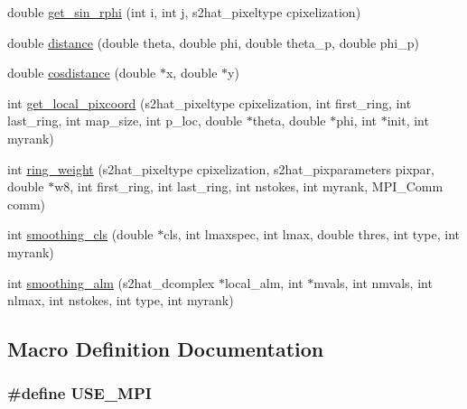 \begin{DoxyCompactItemize}
\item 
double \hyperlink{rng_2common_2lensing__sub_8c_aacc42f0ba3fce9b9951cd6dba4d60ebf}{get\-\_\-sin\-\_\-rphi} (int i, int j, s2hat\-\_\-pixeltype cpixelization)
\item 
double \hyperlink{rng_2common_2lensing__sub_8c_a8dbb3ac3e6c8aa872d542c9789239708}{distance} (double theta, double phi, double theta\-\_\-p, double phi\-\_\-p)
\item 
double \hyperlink{rng_2common_2lensing__sub_8c_a356fc5cd79e083685c111f791709e85b}{cosdistance} (double $\ast$x, double $\ast$y)
\item 
int \hyperlink{rng_2common_2lensing__sub_8c_a1885e18dc221add8ca7394f9036fe883}{get\-\_\-local\-\_\-pixcoord} (s2hat\-\_\-pixeltype cpixelization, int first\-\_\-ring, int last\-\_\-ring, int map\-\_\-size, int p\-\_\-loc, double $\ast$theta, double $\ast$phi, int $\ast$init, int myrank)
\item 
int \hyperlink{rng_2common_2lensing__sub_8c_a87dbb12172642ed57bdcb2e08f81d9e1}{ring\-\_\-weight} (s2hat\-\_\-pixeltype cpixelization, s2hat\-\_\-pixparameters pixpar, double $\ast$w8, int first\-\_\-ring, int last\-\_\-ring, int nstokes, int myrank, M\-P\-I\-\_\-\-Comm comm)
\item 
int \hyperlink{rng_2common_2lensing__sub_8c_aac6a81491aae649df50864a5ba13afac}{smoothing\-\_\-cls} (double $\ast$cls, int lmaxspec, int lmax, double thres, int type, int myrank)
\item 
int \hyperlink{rng_2common_2lensing__sub_8c_a00415e2ef1c5fe6623ed428b6460b056}{smoothing\-\_\-alm} (s2hat\-\_\-dcomplex $\ast$local\-\_\-alm, int $\ast$mvals, int nmvals, int nlmax, int nstokes, int type, int myrank)
\end{DoxyCompactItemize}


\subsection{Macro Definition Documentation}
\subsubsection[{U\-S\-E\-\_\-\-M\-P\-I}]{\setlength{\rightskip}{0pt plus 5cm}\#define U\-S\-E\-\_\-\-M\-P\-I}\label{rng_2common_2lensing__sub_8c_a3869d282031f6ea6b50fdb980b758420}


